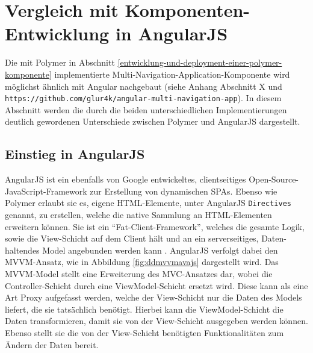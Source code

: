 \section{Vergleich mit Komponenten-Entwicklung in AngularJS}\label{vergleich-mit-komponenten-entwicklung-in-angularjs}

Die mit Polymer in Abschnitt \ref{entwicklung-und-deployment-einer-polymer-komponente} implementierte Multi-Navigation-Application-Kom\-po\-nen\-te wird möglichst ähnlich mit Angular nachgebaut (siehe Anhang Abschnitt X  und \texttt{https://github.com/glur4k/angular-multi-navigation-app}). In diesem Abschnitt werden die durch die beiden unterschiedlichen Implementierungen deutlich gewordenen Unterschiede zwischen Polymer und AngularJS dargestellt.


\subsection{Einstieg in AngularJS}\label{einstieg-in-angularjs}

AngularJS ist ein ebenfalls von Google entwickeltes, clientseitiges Open-Source-JavaScript-Framework zur Erstellung von dynamischen \ac{SPA}s. Ebenso wie Polymer erlaubt sie es, eigene \ac{HTML}-Elemente, unter AngularJS \texttt{Directives} genannt, zu erstellen, welche die native Sammlung an \ac{HTML}-Elementen erweitern können. Sie ist ein ``Fat-Client-Framework'', welches die gesamte Logik, sowie die View-Schicht auf dem Client hält und an ein serverseitiges, Daten-haltendes Model angebunden werden kann \cite{citeulike:13920434}. AngularJS verfolgt dabei den \ac{MVVM}-Ansatz, wie in Abbildung \ref{fig:ddmvvmavajs} dargestellt wird. Das \ac{MVVM}-Model stellt eine Erweiterung des \ac{MVC}-Ansatzes dar, wobei die Controller-Schicht durch eine ViewModel-Schicht ersetzt wird. Diese kann als eine Art Proxy aufgefasst werden, welche der View-Schicht nur die Daten des Models liefert, die sie tatsächlich benötigt. Hierbei kann die ViewModel-Schicht die Daten transformieren, damit sie von der View-Schicht ausgegeben werden können. Ebenso stellt sie die von der View-Schicht benötigten Funktionalitäten zum Ändern der Daten bereit.

